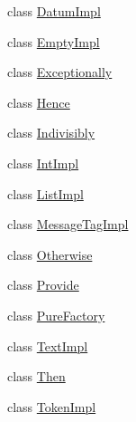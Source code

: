 \begin{CompactItemize}
\item 
class \hyperlink{classDatumImpl}{Datum\-Impl}
\item 
class \hyperlink{classEmptyImpl}{Empty\-Impl}
\item 
class \hyperlink{classExceptionally}{Exceptionally}
\item 
class \hyperlink{classHence}{Hence}
\item 
class \hyperlink{classIndivisibly}{Indivisibly}
\item 
class \hyperlink{classIntImpl}{Int\-Impl}
\item 
class \hyperlink{classListImpl}{List\-Impl}
\item 
class \hyperlink{classMessageTagImpl}{Message\-Tag\-Impl}
\item 
class \hyperlink{classOtherwise}{Otherwise}
\item 
class \hyperlink{classProvide}{Provide}
\item 
class \hyperlink{classPureFactory}{Pure\-Factory}
\item 
class \hyperlink{classTextImpl}{Text\-Impl}
\item 
class \hyperlink{classThen}{Then}
\item 
class \hyperlink{classTokenImpl}{Token\-Impl}
\end{CompactItemize}
